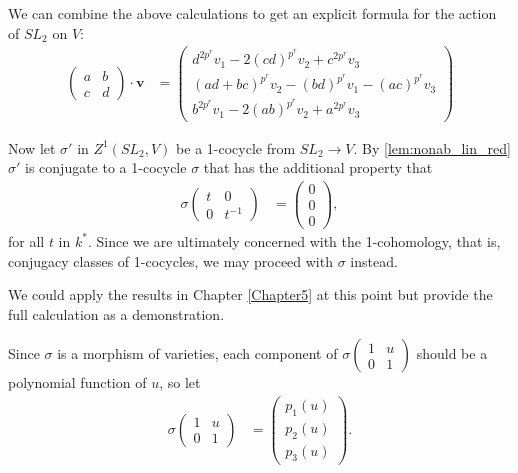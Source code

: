 We can combine the above calculations to get an explicit formula for the action of $SL_2$ on $V$:
\begin{align*}
\left(\begin{matrix} a & b \\ c & d\end{matrix}\right) \cdot \mathbf{v} &=
\left(\begin{matrix}
d^{2p^r}v_1 -2(cd)^{p^r}v_2 + c^{2p^r}v_3 \\
(ad + bc)^{p^r}v_2 - (bd)^{p^r}v_1 - (ac)^{p^r}v_3 \\
b^{2p^r}v_1 -2(ab)^{p^r}v_2 + a^{2p^r}v_3
\end{matrix}\right)
\end{align*}

Now let $\sigma'$ in $Z^1(SL_2, V)$ be a 1-cocycle from $SL_2\rightarrow V$. By \ref{lem:nonab_lin_red} $\sigma'$ is conjugate to a 1-cocycle $\sigma$ that has the additional property that
\begin{align*}
\sigma\left( \begin{matrix} t & 0 \\ 0 & t^{-1}\end{matrix}\right) &= 
\left( \begin{matrix} 0 \\ 0 \\0\end{matrix}\right),
\end{align*}
for all $t$ in $k^*$. Since we are ultimately concerned with the 1-cohomology, that is, conjugacy classes of 1-cocycles, we may proceed with $\sigma$ instead.

We could apply the results in Chapter \ref{Chapter5} at this point but provide the full calculation as a demonstration.

Since $\sigma$ is a morphism of varieties, each component of $\sigma\left(\begin{matrix} 1& u \\ 0 & 1\end{matrix}\right)$ should be a polynomial function of $u$, so let
\begin{align*}
\sigma\left(\begin{matrix} 1& u \\ 0 & 1\end{matrix}\right) &=
\left(\begin{matrix} p_1(u) \\ p_2(u) \\ p_3(u) \end{matrix}\right).
\end{align*}

